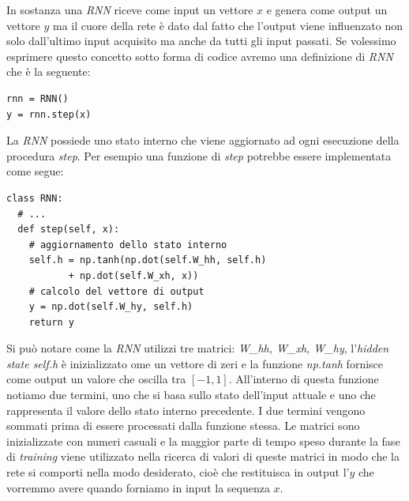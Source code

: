 \documentclass[a4paper,12pt,openright,twoside]{report}
\theoremstyle{definition}
\begin{document}
In sostanza una \emph{RNN} riceve come input un vettore $x$ e genera come output un vettore $y$ ma il cuore della rete
è dato dal fatto che l'output viene influenzato non solo dall'ultimo input acquisito ma anche da tutti gli 
input passati. Se volessimo esprimere questo concetto sotto forma di codice avremo una definizione di \emph{RNN}
che è la seguente:
\begin{verbatim}
rnn = RNN()
y = rnn.step(x)
\end{verbatim}
La \emph{RNN} possiede uno stato interno che viene aggiornato ad ogni esecuzione della procedura \emph{step}.
Per esempio una funzione di \emph{step} potrebbe essere implementata come segue:
\begin{verbatim}
class RNN:
  # ...
  def step(self, x):
    # aggiornamento dello stato interno
    self.h = np.tanh(np.dot(self.W_hh, self.h) 
           + np.dot(self.W_xh, x))
    # calcolo del vettore di output
    y = np.dot(self.W_hy, self.h)
    return y
\end{verbatim}

Si può notare come la \emph{RNN} utilizzi tre matrici: \emph{W\_hh, W\_xh, W\_hy}, l'\emph{hidden state self.h}
è inizializzato ome un vettore di zeri e la funzione \emph{np.tanh} fornisce come output un valore che oscilla tra $[-1,1]$.
All'interno di questa funzione notiamo due termini, uno che si basa sullo stato dell'input attuale e uno che 
rappresenta il valore dello stato interno precedente. I due termini vengono sommati prima di essere processati dalla 
funzione stessa.
Le matrici sono inizializzate con numeri casuali e la maggior parte di tempo speso durante la fase di
\emph{training} viene utilizzato nella ricerca di valori di queste matrici in modo che 
la rete si comporti nella modo desiderato, cioè che restituisca in output l'$y$ che vorremmo avere
quando forniamo in input la sequenza $x$.
\end{document}
